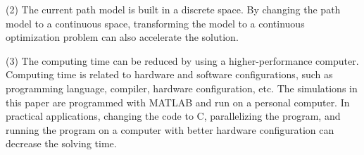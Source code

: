 (2) The current path model is built in a discrete space. By changing the path model to a continuous space, transforming the model to a continuous optimization problem can also accelerate the solution.

(3) The computing time can be reduced by using a higher-performance computer. Computing time is related to hardware and software configurations, such as programming language, compiler, hardware configuration, etc. The simulations in this paper are programmed with MATLAB and run on a personal computer. In practical applications, changing the code to C, parallelizing the program, and running the program on a computer with better hardware configuration can decrease the solving time.
